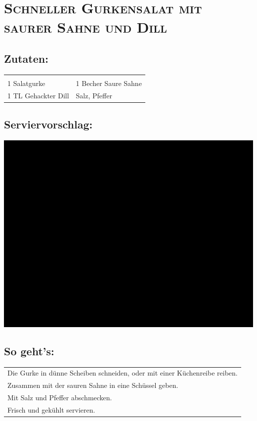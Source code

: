 \section{\textsc{Schneller Gurkensalat mit saurer Sahne und Dill}}

\subsection*{Zutaten:}

\begin{tabular}{p{7.5cm} p{7.5cm}}
	& \\
	1 Salatgurke & 1 Becher Saure Sahne \\
	1 TL Gehackter Dill & Salz, Pfeffer
\end{tabular}

\subsection*{Serviervorschlag:}

\includegraphics[width=\textwidth]{img/ph.jpg}

\subsection*{So geht's:}

\begin{tabular}{p{15cm}}
	\\
  Die Gurke in dünne Scheiben schneiden, oder mit einer Küchenreibe reiben.\\
  Zusammen mit der sauren Sahne in eine Schüssel geben.\\
  Mit Salz und Pfeffer abschmecken.\\
  Frisch und gekühlt servieren.
\end{tabular}
